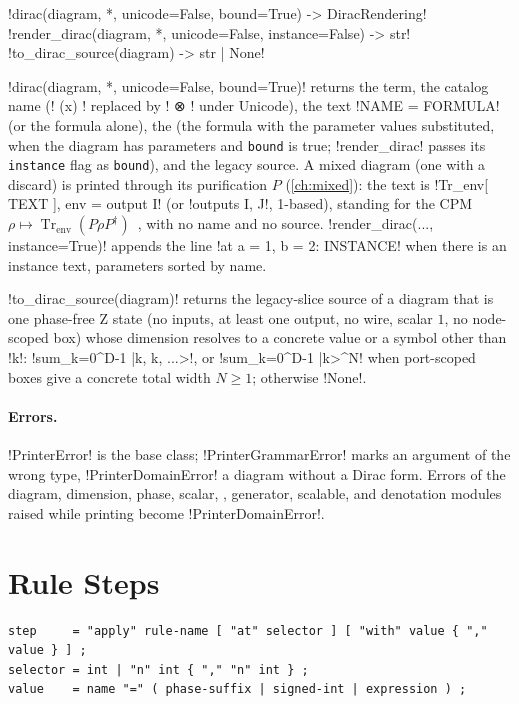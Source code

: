 \begin{signature}
\py!dirac(diagram, *, unicode=False, bound=True) -> DiracRendering!\\
\py!render_dirac(diagram, *, unicode=False, instance=False) -> str!\\
\py!to_dirac_source(diagram) -> str | None!
\end{signature}

\py!dirac(diagram, *, unicode=False, bound=True)! returns the term, the catalog name (\code! (x) ! replaced by \code! ⊗ ! under Unicode), the text \code!NAME = FORMULA! (or the formula alone), the  (the formula with the parameter values substituted, when the diagram has parameters and \texttt{bound} is true; \py!render_dirac! passes its \texttt{instance} flag as \texttt{bound}), and the legacy source. A mixed diagram (one with a discard) is printed through its purification $P$ (\cref{ch:mixed}): the text is \code!Tr_env[ TEXT ], env = output I! (or \code!outputs I, J!, 1-based), standing for the CPM $\rho\mapsto\operatorname{Tr}_{\text{env}}(P\rho P^\dagger)$~\cite{selinger2007cpm}, with no name and no source. \py!render_dirac(..., instance=True)! appends the line \code!at a = 1, b = 2: INSTANCE! when there is an instance text, parameters sorted by name.

\py!to_dirac_source(diagram)! returns the legacy-slice source of a diagram that is one phase-free Z state (no inputs, at least one output, no wire, scalar $1$, no node-scoped box) whose dimension resolves to a concrete value or a symbol other than \code!k!: \code!sum_{k=0}^{D-1} |k, k, ...>!, or \code!sum_{k=0}^{D-1} |k>^{N}! when port-scoped boxes give a concrete total width $N\ge1$; otherwise \py!None!.

\paragraph{Errors.} \py!PrinterError! is the base class; \py!PrinterGrammarError! marks an argument of the wrong type, \py!PrinterDomainError! a diagram without a Dirac form. Errors of the diagram, dimension, phase, scalar, \bbox{}, generator, scalable, and denotation modules raised while printing become \py!PrinterDomainError!.

\section{Rule Steps}\label{sec:language-steps}

\begin{lstlisting}[style=grammar,caption={Rule step grammar.},label={lst:language-step}]
step     = "apply" rule-name [ "at" selector ] [ "with" value { "," value } ] ;
selector = int | "n" int { "," "n" int } ;
value    = name "=" ( phase-suffix | signed-int | expression ) ;
\end{lstlisting}

